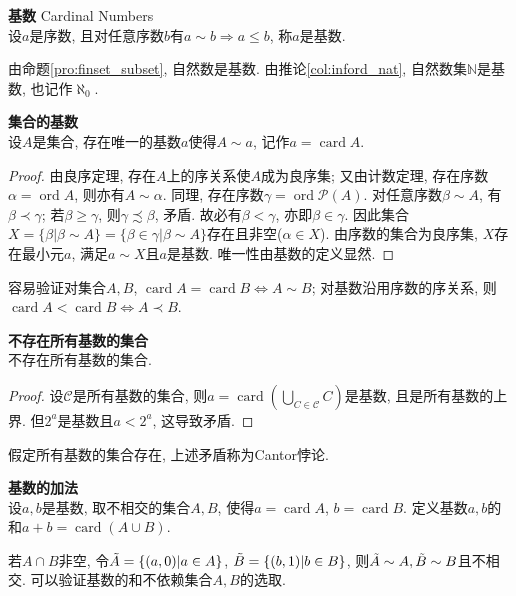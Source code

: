 \begin{dfn} \textbf{基数} Cardinal Numbers\\
设$a$是序数, 且对任意序数$b$有$a\sim b\Rightarrow a\le b$, 称$a$是基数. 
\end{dfn}
\par 由命题\ref{pro:finset_subset}, 自然数是基数. 由推论\ref{col:inford_nat}, 自然数集$\mathbb{N}$是基数, 也记作$\aleph_0$. 

\begin{pro} \textbf{集合的基数}\\
设$A$是集合, 存在唯一的基数$a$使得$A\sim a$, 记作$a=\operatorname{card}A$. 
\end{pro}
\begin{proof}
由良序定理, 存在$A$上的序关系使$A$成为良序集; 又由计数定理, 存在序数$\alpha=\operatorname{ord}A$, 则亦有$A\sim \alpha$. 同理, 存在序数$\gamma= \operatorname{ord}\mathcal{P}(A)$. 对任意序数$\beta \sim A$, 有$\beta \prec \gamma$; 若$\beta \ge \gamma$, 则$\gamma \precsim \beta$, 矛盾. 故必有$\beta<\gamma$, 亦即$\beta\in \gamma$. 因此集合$X=\{\beta\vert \beta\sim A\}=\{\beta\in \gamma\vert \beta\sim A\}$存在且非空($\alpha\in X$). 由序数的集合为良序集, $X$存在最小元$a$, 满足$a\sim X$且$a$是基数. 唯一性由基数的定义显然. 
\end{proof}
容易验证对集合$A,B$, $\operatorname{card}A=\operatorname{card}B \iff A\sim B$; 对基数沿用序数的序关系, 则 $\operatorname{card}A<\operatorname{card}B \iff A\prec B$.

\begin{col} \textbf{不存在所有基数的集合}\\
不存在所有基数的集合. 
\end{col}
\begin{proof}
设$\mathcal{C}$是所有基数的集合, 则$a =\operatorname{card}\left(\bigcup_{C\in \mathcal{C}}C\right)$是基数, 且是所有基数的上界. 但$2^a$是基数且$a<2^a$, 这导致矛盾. 
\end{proof}
\par 假定所有基数的集合存在, 上述矛盾称为Cantor悖论.

\begin{dfn} \textbf{基数的加法}\\
设$a,b$是基数, 取不相交的集合$A,B$, 使得$a=\operatorname{card}A$, $b=\operatorname{card}B$. 定义基数$a,b$的和$a+b=\operatorname{card}(A\cup B)$. 
\end{dfn}
若$A\cap B$非空, 令$\Tilde{A}=\{(a, 0)\vert a\in A\}$, $\Tilde{B}=\{(b, 1)\vert b\in B\}$, 则$\Tilde{A}\sim A, \Tilde{B}\sim B$且不相交. 可以验证基数的和不依赖集合$A,B$的选取.

